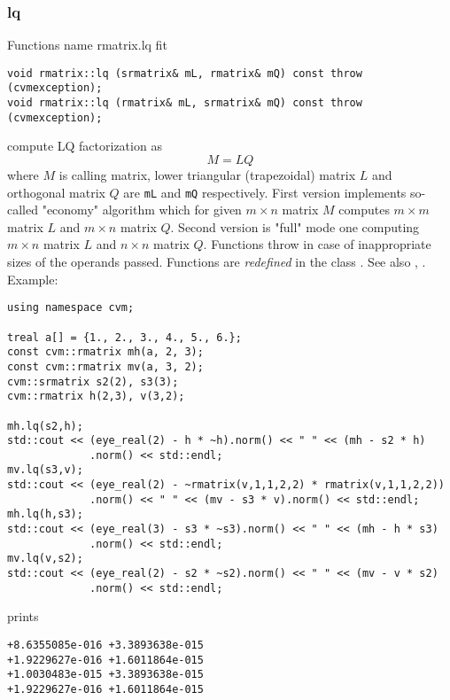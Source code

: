 \subsubsection{lq}
Functions%
\pdfdest name {rmatrix.lq} fit
\begin{verbatim}
void rmatrix::lq (srmatrix& mL, rmatrix& mQ) const throw (cvmexception);
void rmatrix::lq (rmatrix& mL, srmatrix& mQ) const throw (cvmexception);
\end{verbatim}
compute LQ factorization as
\begin{equation*}
M=LQ
\end{equation*}
where 
$M$ is  calling matrix, lower triangular (trapezoidal) matrix $L$
and orthogonal matrix $Q$  are \verb"mL" and \verb"mQ"
respectively. First version implements so-called "economy" algorithm
which for  given $m\times n$ matrix $M$ computes $m\times m$ matrix $L$
and $m\times n$ matrix $Q$. Second version is "full" mode one
computing $m\times n$ matrix $L$ and $n\times n$ matrix $Q$.
Functions throw
in case of inappropriate sizes of the operands passed.
Functions are \emph{redefined} in the class
.
See also ,
.
Example:
\begin{Verbatim}
using namespace cvm;

treal a[] = {1., 2., 3., 4., 5., 6.};
const cvm::rmatrix mh(a, 2, 3);
const cvm::rmatrix mv(a, 3, 2);
cvm::srmatrix s2(2), s3(3);
cvm::rmatrix h(2,3), v(3,2);

mh.lq(s2,h);
std::cout << (eye_real(2) - h * ~h).norm() << " " << (mh - s2 * h)
             .norm() << std::endl;
mv.lq(s3,v);
std::cout << (eye_real(2) - ~rmatrix(v,1,1,2,2) * rmatrix(v,1,1,2,2))
             .norm() << " " << (mv - s3 * v).norm() << std::endl;
mh.lq(h,s3);
std::cout << (eye_real(3) - s3 * ~s3).norm() << " " << (mh - h * s3)
             .norm() << std::endl;
mv.lq(v,s2);
std::cout << (eye_real(2) - s2 * ~s2).norm() << " " << (mv - v * s2)
             .norm() << std::endl;
\end{Verbatim}
prints
\begin{Verbatim}
+8.6355085e-016 +3.3893638e-015
+1.9229627e-016 +1.6011864e-015
+1.0030483e-015 +3.3893638e-015
+1.9229627e-016 +1.6011864e-015
\end{Verbatim}
\newpage





